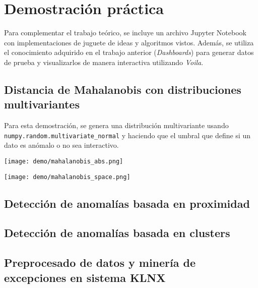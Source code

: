 \chapter{Demostración práctica}
Para complementar el trabajo teórico, se incluye un archivo Jupyter Notebook con
implementaciones de juguete de ideas y algoritmos vistos. Además, se utiliza el
conocimiento adquirido en el trabajo anterior (\textit{Dashboards}) para generar
datos de prueba y visualizarlos de manera interactiva utilizando \textit{Voila}.

\section{Distancia de Mahalanobis con distribuciones multivariantes}
Para esta demostración, se genera una distribución multivariante usando \\
\Verb#numpy.random.multivariate_normal# y haciendo que el umbral que define si un dato
es anómalo o no sea interactivo.

\noindent
\begin{minipage}{\linewidth}
	\centering
	\texttt{[image: demo/mahalanobis\_abs.png]}
	\label{fig:demo11}
\end{minipage}

\noindent
\begin{minipage}{\linewidth}
	\centering
	\texttt{[image: demo/mahalanobis\_space.png]}
	\label{fig:demo12}
\end{minipage}

\section{Detección de anomalías basada en proximidad}

\section{Detección de anomalías basada en clusters}

\section{Preprocesado de datos y minería de excepciones en sistema KLNX}
